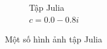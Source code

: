 \documentclass[oneside,final]{report}
\begin{document}
\begin{figure}[H]
\begin{subfigure}[b]{0.3\textwidth}
    \caption{Tập Julia \\ $c=0.0-0.8i$}
    \label{fig:julia_set_6}
  \end{subfigure}
    \caption{Một số hình ảnh tập Julia}
    \label{fig:julia_all}
\end{figure}


\clearpage
\printbibliography
\end{document}
